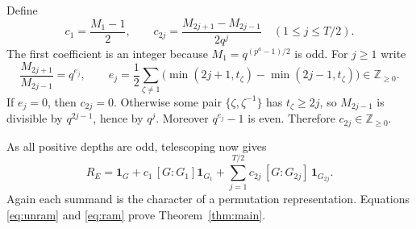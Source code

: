 \documentclass[11pt]{article}
\theoremstyle{plain}
\theoremstyle{definition}
\begin{document}
Define
\[
 c_1=\frac{M_1-1}{2},\qquad
 c_{2j}=\frac{M_{2j+1}-M_{2j-1}}{2q^j}\quad(1\leq j\leq T/2).
\]
The first coefficient is an integer because $M_1=q^{(p^a-1)/2}$ is odd. For $j\geq1$ write
\[
 \frac{M_{2j+1}}{M_{2j-1}}=q^{e_j},\qquad
 e_j=\frac12\sum_{\zeta\ne1}\bigl(\min(2j+1,t_\zeta)-\min(2j-1,t_\zeta)\bigr)\in\mathbb Z_{\geq0}.
\]
If $e_j=0$, then $c_{2j}=0$. Otherwise some pair $\{\zeta,\zeta^{-1}\}$ has $t_\zeta\geq2j$, so $M_{2j-1}$ is divisible by $q^{2j-1}$, hence by $q^j$. Moreover $q^{e_j}-1$ is even. Therefore $c_{2j}\in\mathbb Z_{\geq0}$.

As all positive depths are odd, telescoping now gives
\begin{equation}\label{eq:ram}
\boxed{R_E=\mathbf1_G+c_1\,[G:G_1] \mathbf1_{G_1}
 +\sum_{j=1}^{T/2}c_{2j}\,[G:G_{2j}]\,\mathbf1_{G_{2j}}.}
\end{equation}
Again each summand is the character of a permutation representation. Equations \eqref{eq:unram} and \eqref{eq:ram} prove Theorem~\ref{thm:main}.
\end{document}
